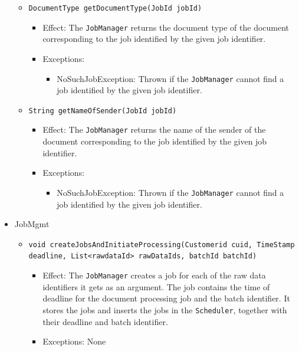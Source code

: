 \documentclass[a4paper,10pt]{article}
\begin{document}
\begin{itemize}
\begin{itemize}
         \item \texttt{DocumentType getDocumentType(JobId jobId)}
        \begin{itemize}
            \item Effect: The \texttt{JobManager} returns the document type of the document corresponding to the job identified by the given job identifier.
            \item Exceptions:
            \begin{itemize}
            	\item NoSuchJobException: Thrown if the \texttt{JobManager} cannot find a job identified by the given job identifier.
            \end{itemize}
        \end{itemize}    
        
        \item \texttt{String getNameOfSender(JobId jobId)}    
        \begin{itemize}
            \item Effect: The \texttt{JobManager} returns the name of the sender of the document corresponding to the job identified by the given job identifier.
            \item Exceptions:
            \begin{itemize}
            	\item NoSuchJobException: Thrown if the \texttt{JobManager} cannot find a job identified by the given job identifier.
            \end{itemize}
        \end{itemize}
        
    \end{itemize}    

    \item JobMgmt
    \begin{itemize}
    	\item \texttt{void createJobsAndInitiateProcessing(Customerid cuid, TimeStamp deadline, List<rawdataId> rawDataIds, batchId batchId)}
    	\begin{itemize}
            \item Effect: The \texttt{JobManager} creates a job for each of the raw data identifiers it gets as an argument. The job contains the time of deadline for the document processing job and the batch identifier. It stores the jobs and inserts the jobs in the \texttt{Scheduler}, together with their deadline and batch identifier.
            \item Exceptions: None
        \end{itemize}
    	

\end{itemize}
\end{itemize}
\end{document}

